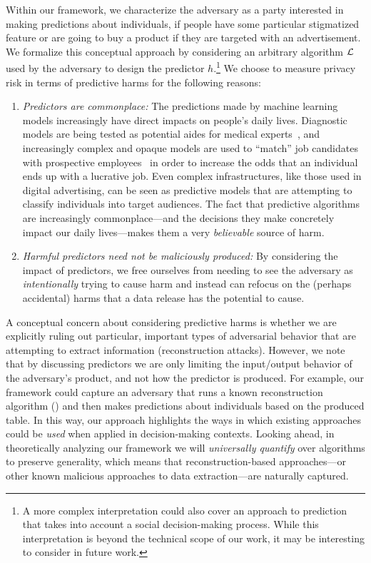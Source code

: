 Within our framework, we characterize the adversary as a party interested in making predictions about individuals, \eg if people have some particular stigmatized feature or are going to buy a product if they are targeted with an advertisement. We formalize this conceptual approach by considering an arbitrary algorithm $\mathcal{L}$ used by the adversary to design the predictor $h$.\footnote{A more complex interpretation could also cover an approach to prediction that takes into account a social decision-making process.  While this interpretation is beyond the technical scope of our work, it may be interesting to consider in future work.} We choose to measure privacy risk in terms of predictive harms for the following reasons:
\begin{enumerate}[--,leftmargin=*]
    \item \emph{Predictors are commonplace:}  The predictions made by machine learning models increasingly have direct impacts on people's daily lives. Diagnostic models are being tested as potential aides for medical experts~\cite{AhsanLS22}, and increasingly complex and opaque models are used to ``match'' job candidates with prospective employees~\cite{indeed,ideal,aihr} in order to increase the odds that an individual ends up with a lucrative job. Even complex infrastructures, like those used in digital advertising, can be seen as predictive models that are attempting to classify individuals into target audiences. The fact that predictive algorithms are increasingly commonplace---and the decisions they make concretely impact our daily lives---makes them a very \emph{believable} source of harm.
    
    \item \emph{Harmful predictors need not be maliciously produced:} By considering the impact of predictors, we free ourselves from needing to see the adversary as \emph{intentionally} trying to cause harm and instead can refocus on the (perhaps accidental) harms that a data release has the potential to cause. 
    

\end{enumerate}

A conceptual concern about considering predictive harms is whether we are explicitly ruling out particular, important types of adversarial behavior that are attempting to extract information (\eg reconstruction attacks). However, we note that by discussing predictors we are only limiting the input/output behavior of the adversary's product, and not how the predictor is produced. For example, our framework could capture an adversary that runs a known reconstruction algorithm (\eg \cite{DickDKLRVZ22}) and then makes predictions about individuals based on the produced table.  In this way, our approach highlights the ways in which existing approaches could be \emph{used} when applied in decision-making contexts. Looking ahead, in theoretically analyzing our framework we will \emph{universally quantify} over algorithms to preserve generality, which means that reconstruction-based approaches---or other known malicious approaches to data extraction---are naturally captured.

